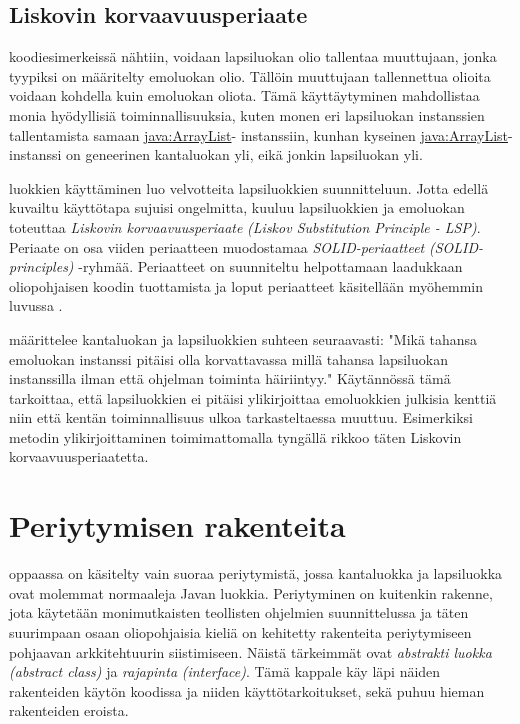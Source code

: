 \documentclass{tufte-book}
\newcommand{\eng}[1]{\textit{(#1)}}
\newcommand{\new}[1]{\textit{\gls{#1}}}
\newcommand{\neweng}[2]{\new{#1} \eng{#2}}
\newcommand{\java}[1]{\underline{\gls{java:#1}}}
\begin{document}
\subsection{Liskovin korvaavuusperiaate}
\label{LSP}

  koodiesimerkeissä nähtiin, voidaan lapsiluokan olio
tallentaa muuttujaan, jonka tyypiksi on määritelty emoluokan olio. Tällöin muuttujaan tallennettua
olioita voidaan kohdella kuin emoluokan oliota. Tämä käyttäytyminen mahdollistaa monia hyödyllisiä
toiminnallisuuksia, kuten monen eri lapsiluokan instanssien tallentamista samaan \java{ArrayList}-
instanssiin, kunhan kyseinen \java{ArrayList}-instanssi on geneerinen kantaluokan yli, eikä
jonkin lapsiluokan yli.

 luokkien käyttäminen luo velvotteita lapsiluokkien suunnitteluun.
Jotta edellä kuvailtu käyttötapa sujuisi ongelmitta, kuuluu lapsiluokkien ja emoluokan toteuttaa
\neweng{Liskovin korvaavuusperiaate}{Liskov Substitution Principle - LSP}. Periaate on osa
viiden periaatteen muodostamaa \neweng{SOLID-periaatteet}{SOLID-principles} -ryhmää. Periaatteet
on suunniteltu helpottamaan laadukkaan oliopohjaisen koodin tuottamista ja loput periaatteet
käsitellään myöhemmin luvussa .

 määrittelee kantaluokan ja lapsiluokkien suhteen
seuraavasti: "Mikä tahansa emoluokan instanssi pitäisi olla korvattavassa millä tahansa 
lapsiluokan instanssilla ilman että ohjelman toiminta häiriintyy." Käytännössä tämä tarkoittaa,
että lapsiluokkien ei pitäisi ylikirjoittaa emoluokkien julkisia kenttiä niin että kentän
toiminnallisuus ulkoa tarkasteltaessa muuttuu. Esimerkiksi metodin ylikirjoittaminen
toimimattomalla tyngällä rikkoo täten Liskovin korvaavuusperiaatetta.


\section{Periytymisen rakenteita}
\label{periytyminen5}

 oppaassa on käsitelty vain suoraa periytymistä, jossa
\gls{kantaluokka} ja \gls{lapsiluokka} ovat molemmat normaaleja Javan luokkia. Periytyminen on
kuitenkin rakenne, jota käytetään monimutkaisten teollisten ohjelmien suunnittelussa ja täten
suurimpaan osaan oliopohjaisia kieliä on kehitetty rakenteita periytymiseen pohjaavan
arkkitehtuurin siistimiseen. Näistä tärkeimmät ovat \neweng{abstrakti luokka}{abstract class} ja
\neweng{rajapinta}{interface}. Tämä kappale käy läpi näiden rakenteiden käytön koodissa ja niiden
käyttötarkoitukset, sekä puhuu hieman rakenteiden eroista.
\end{document}
